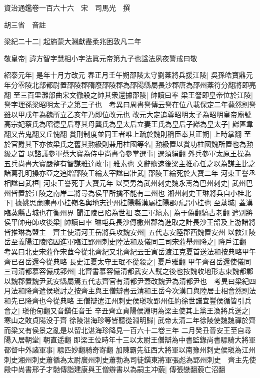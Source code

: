 資治通鑑卷一百六十六　宋　司馬光　撰

胡三省　音註

梁紀二十二|{
	起旃蒙大淵獻盡柔兆困敦凡二年}


敬皇帝|{
	諱方智字慧相小字法眞元帝第九子也諡法夙夜警戒曰敬}


紹泰元年|{
	是年十月方改元}
春正月壬午朔邵陵太守劉棻將兵援江陵|{
	吳孫皓寶鼎元年分零陵北部都尉置邵陵郡隋廢邵陵郡為邵陽縣屬長沙郡唐為邵州棻符分翻將即亮翻}
至三百里灘部曲宋文徹殺之帥其衆還據邵陵|{
	帥讀曰率}
梁王詧即皇帝位於江陵|{
	詧字理孫梁昭明太子之第三子也　考異曰周書詧傳云詧在位八載保定二年薨然則詧雖以甲戌年為魏所立乙亥年乃即位改元也}
改元大定追尊昭明太子為昭明皇帝廟號高宗妃蔡氏為昭德皇后尊其母龔氏為皇太后立妻王氏為皇后子巋為皇太子|{
	巋區韋翻又苦鬼翻又丘愧翻}
賞刑制度並同王者唯上疏於魏則稱臣奉其正朔|{
	上時掌翻}
至於官爵其下亦依梁氏之舊其勲級則兼用柱國等名|{
	勲級置以賞功柱國魏所置也為勲級之首}
以諮議參軍蔡大寶為侍中尚書令參掌選事|{
	選須絹翻}
外兵參軍太原王操為五兵尚書大寶嚴整有智謀雅達政事|{
	雅素也}
文辭贍速後梁主推心任之以為謀主比之諸葛孔明操亦亞之追贈邵陵王綸太宰諡曰壯武|{
	邵陵王綸死於大寶二年}
河東王譽丞相諡曰武桓|{
	河東王譽死于大寶元年}
以莫男為武州刺史魏永夀為巴州刺史|{
	武州巴州皆置於江陵之南岸二將尋為侯平所擒不能有二州也}
湘州刺史王琳將兵自小桂北下|{
	據姚思亷陳書小桂嶺名輿地志連州桂陽縣漢屬桂陽郡所謂小桂也}
至蒸城|{
	蓋漢臨蒸縣古城也在衡州界}
聞江陵已陷為世祖哀三軍縞素|{
	為于偽翻縞古老翻}
遣别將侯平帥舟師攻後梁|{
	帥讀曰率}
琳屯兵長沙傳檄州郡為進取之計長沙王韶及上游諸將皆推琳為盟主　齊主使清河王岳將兵攻魏安州|{
	五代志安陸郡西魏置安州}
以救江陵岳至義陽江陵陷因進軍臨江郢州刺史陸法和及儀同三司宋蒞舉州降之|{
	降戶江翻　考異曰北史宋蒞作宋茝今從北齊紀又北齊紀云壬寅岳渡江克夏首送法和按典略甲午齊已召岳還今從典略}
長史江夏太守王珉不從殺之|{
	夏戶雅翻}
甲午齊召岳還使儀同三司清都慕容儼戍郢州|{
	北齊書慕容儼清都武安人皝之後也按魏收地形志東魏都鄴以魏郡置魏尹武安縣屬焉五代志齊官有清都尹蓋改魏尹為清都尹也　考異曰梁紀四月法和降齊遣侯瑱討之按齊主與王僧辯書云清和王岳今次漢口與陸居士相會然則法和先已降齊也今從典略}
王僧辯遣江州刺史侯瑱攻郢州任約徐世譜宜豐侯循皆引兵會之|{
	瑱他甸翻又音鎭任音壬}
辛丑齊立貞陽侯淵明為梁主使其上黨王渙將兵送之|{
	寒山之敗貞陽没于齊}
徐陵湛海珍等皆聽從淵明歸|{
	武帝太清二年徐陵使魏魏禪於齊而梁又有侯景之亂是以留北湛海珍降見一百六十二卷三年}
二月癸丑晉安王至自尋陽入居朝堂|{
	朝直遥翻}
即梁王位時年十三以太尉王僧辯為中書監錄尚書驃騎大將軍都督中外諸軍事|{
	驃匹妙翻騎奇寄翻}
加陳霸先征西大將軍以南豫州刺史侯瑱為江州刺史湘州刺史蕭循為太尉廣州刺史蕭勃為司徒鎭東將軍張彪為郢州刺史　齊主先使殿中尚書邢子才馳傳詣建康與王僧辯書以為嗣主冲藐|{
	傳張戀翻藐亡沼翻}
